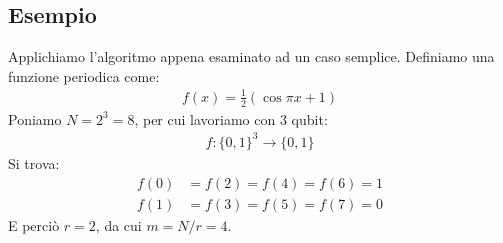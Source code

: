 \documentclass[../../InformazioneQuantistica.tex]{subfiles}
\begin{document}
\subsection{Esempio} 
Applichiamo l'algoritmo appena esaminato ad un caso semplice. Definiamo una funzione periodica come:
\begin{align*}
f(x) = \frac{1}{2}(\cos \pi x + 1) 
\end{align*}
Poniamo $N=2^3=8$, per cui lavoriamo con $3$ qubit:
\begin{align*}
f\colon \{0,1\}^3 \to \{0,1\}
\end{align*}
Si trova:
\begin{align*}
f(0) &= f(2) = f(4) = f(6) = 1\\
f(1) &= f(3) = f(5) = f(7) = 0
\end{align*}
E perciò $r=2$, da cui $m=N/r= 4$.
\end{document}
